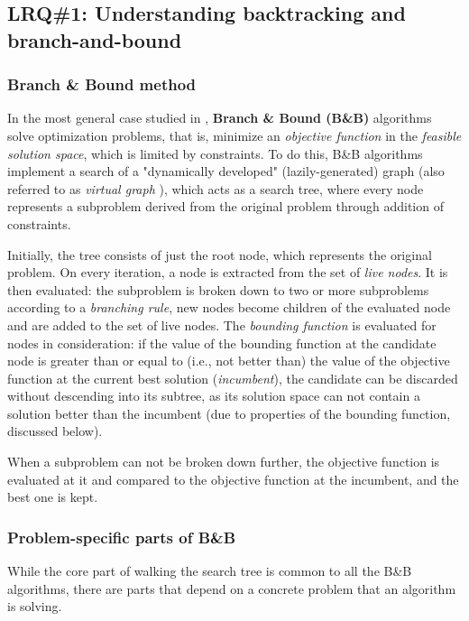 \subsection{LRQ\#1: Understanding backtracking and branch-and-bound}

\subsubsection{Branch \& Bound method}

In the most general case studied in \cite{clausen1999principles}, \textbf{Branch \& Bound (B\&B)}
algorithms solve optimization problems, that is, minimize an \emph{objective function} in the
\emph{feasible solution space}, which is limited by constraints. To do this, B\&B algorithms
implement a search of a "dynamically developed" (lazily-generated) graph
(also referred to as \emph{virtual graph}
    \cite{shilov2011rutemplateverif} \cite{shilov2012verifmono}),
which acts as a search tree, where every node represents a subproblem derived from the
original problem through addition of constraints.

Initially, the tree consists of just the root node, which represents the original problem.
On every iteration, a node is extracted from the set of \emph{live nodes}.
It is then evaluated: the subproblem is broken down to
two \cite{narkawicz2013formalnasa} or more \cite{clausen1999principles}
subproblems according to a
\emph{branching rule}, new nodes become children of the evaluated node and are added
to the set of live nodes. The \emph{bounding function} is evaluated for nodes in
consideration: if the value of the bounding function at the candidate node is greater than
or equal to (i.e., not better than) the value of the objective function at the current
best solution (\emph{incumbent}), the candidate can be discarded without descending into
its subtree, as its solution space can not contain a solution better than the incumbent
(due to properties of the bounding function, discussed below).

When a subproblem can not be broken down further, the objective function is evaluated at
it and compared to the objective function at the incumbent, and the best one is kept.

\subsubsection{Problem-specific parts of B\&B}

While the core part of walking the search tree is common to all the B\&B algorithms,
there are parts that depend on a concrete problem that an algorithm is solving.

